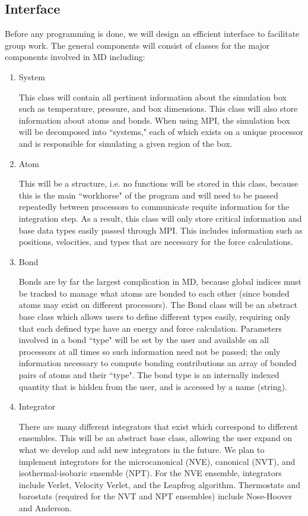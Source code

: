 \documentclass[10pt]{article}
\begin{document}
\subsection{Interface}
Before any programming is done, we will design an efficient interface to facilitate group work. The general components will consist of classes for the major components involved in MD including:
\begin{enumerate}
	\item{System} \par This class will contain all pertinent information about the simulation box such as temperature, pressure, and box dimensions.  This class will also store information about atoms and bonds.  When using MPI, the simulation box will be decomposed into ``systems," each of which exists on a unique processor and is responsible for simulating a given region of the box.  %
	\item{Atom} \par This will be a structure, i.e. no functions will be stored in this class, because this is the main ``workhorse" of the program and will need to be passed repeatedly between processors to communicate requite information for the integration step.  As a result, this class will only store critical information and base data types easily passed through MPI.  This includes information such as positions, velocities, and types that are necessary for the force calculations.
	\item{Bond} \par Bonds are by far the largest complication in MD, because global indices must be tracked to manage what atoms are bonded to each other (since bonded atoms may exist on different processors).  The Bond class will be an abstract base class which allows users to define different types easily, requiring only that each defined type have an energy and force calculation.  Parameters involved in a bond ``type" will be set by the user and available on all processors at all times so such information need not be passed; the only information necessary to compute bonding contributions an array of bonded pairs of atoms and their ``type".  The bond type is an internally indexed quantity that is hidden from the user, and is accessed by a name (string).
	\item{Integrator} \par There are many different integrators that exist which correspond to different ensembles.  This will be an abstract base class, allowing the user expand on what we develop and add new integrators in the future.  We plan to implement integrators for the microcanonical  (NVE), canonical (NVT), and isothermal-isobaric ensemble (NPT).  For the NVE ensemble, integrators include Verlet, Velocity Verlet, and the Leapfrog algorithm.  Thermostats and barostats (required for the NVT and NPT ensembles) include Nose-Hoover and Anderson.

\end{enumerate}
\end{document}
